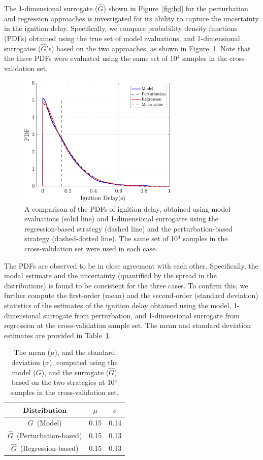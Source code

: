 The 1-dimensional surrogate ($\hat{G}$) shown in Figure~\ref{fig:hd} for the perturbation
and regression approaches is investigated for its ability to capture the uncertainty in the
ignition delay. Specifically, we compare probability density functions (PDFs)
obtained using the true set of model evaluations, and 1-dimensional
surrogates ($\hat{G}$'s) based on the two approaches, as shown in 
Figure~\ref{fig:pdf_36D}. Note that the three PDFs were evaluated using the same set of 10$^4$ samples in the 
cross-validation set. 
%
\begin{figure}[htbp]
\begin{center}
\includegraphics[width=3.0in]{./Figures/pdf_plot36Dp2}
\end{center} 
\caption{A comparison of the PDFs of ignition delay, obtained using model 
evaluations (solid line) and 1-dimensional surrogates using the regression-based strategy (dashed line) and the
perturbation-based strategy (dashed-dotted line). The same set of 10$^4$ samples in the cross-validation set were 
used in each case.}
\label{fig:pdf_36D}
\end{figure}
%
The PDFs are observed to be in close agreement with each other. Specifically, the modal
estimate and the uncertainty (quantified by the spread in the distributions) is found to be consistent for the three 
cases. To confirm this, we further compute the first-order (mean) and the second-order (standard deviation) 
statistics
of the estimates of the ignition delay obtained using the model, 1-dimensional surrogate from perturbation, and
1-dimensional surrogate from regression at the cross-validation sample set. The mean and standard deviation
estimates are provided in Table~\ref{tab:stats}.
%
\begin{table}[htbp]
\begin{center}
\begin{tabular}{ccc}
\toprule
$\textbf{Distribution}$ & $\mu$ & $\sigma$ \\ 
\bottomrule
$G$~(Model) & 0.15 & 0.14 \\
$\hat{G}$~(Perturbation-based) & 0.15 & 0.13 \\
$\hat{G}$~(Regression-based) & 0.15 & 0.13 \\
\bottomrule
\end{tabular}
\caption{The mean ($\mu$), and the standard deviation ($\sigma$), computed using the model ($G$), and
the surrogate ($\hat{G}$) based on the two strategies at 10$^4$ samples in the cross-validation
set.}
\label{tab:stats}
\end{center}
\end{table}
